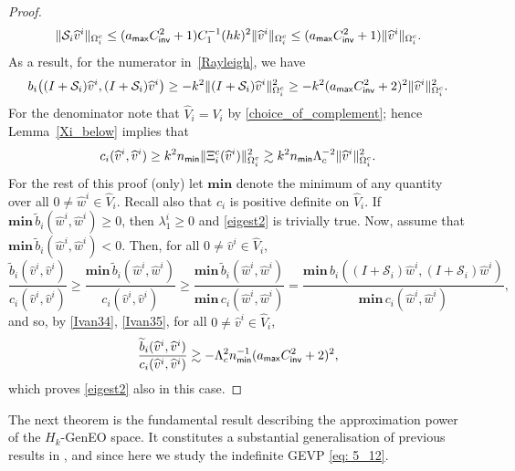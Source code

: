 \documentclass[numbers,webpdf,imaiai]{ima-authoring-template}%
\theoremstyle{thmstyletwo}%
\numberwithin{equation}{section}
\newcommand{\scS}{\mathcal{S}}
\newcommand{\whV}{\widehat{V}}
\newcommand{\whv}{\widehat{v}}
\newcommand{\whw}{\widehat{w}}
\newcommand{\bfmin}{\mathbf{min}\,}
\newcommand{\Cinvt}{C^2_{\textup{\textsf{inv}}}}
\numberwithin{equation}{section}
\newcommand{\amax}{a_{\textup{\textsf{max}}}}
\newcommand{\nmin}{n_{\textup{\textsf{min}}}}
\begin{document}
{\begin{proof}
\begin{equation}
	\|\scS_i\whv^i\|_{\Omega_i^c} \le (\amax\Cinvt + 1) C_1^{-1} (hk)^2 \Vert \whv^i \Vert_{\Omega_i^c} 
	\le (\amax\Cinvt + 1)\Vert \whv^i \Vert_{\Omega_i^c}. 
\end{equation}
As a result, for the numerator in~\eqref{Rayleigh}, we have
\begin{equation} \label{Ivan34}
	b_i\bigl((I+\scS_i)\whv^i , (I+\scS_i)\whv^i\bigr)
	\ge -k^2 \|(I+\scS_i)\whv^i\|_{\Omega_i^c}^2 
	\ge -k^2 (\amax\Cinvt + 2)^2 \|\whv^i\|_{\Omega_i^c}^2.
\end{equation} 
For the denominator note that $\whV_i=V_i$ by \eqref{choice_of_complement}; hence Lemma~\ref{Xi_below} implies that
\begin{equation} 
	c_i(\whv^i, \whv^i) \ge k^2 \nmin\Vert \Xi_i^c( \whv^i )\Vert_{\Omega_i^c}^2  
	\gtrsim  k^2 \nmin\Lambda_c^{-2} \Vert \whv^i \Vert_{\Omega_i^c}^2.
	\label{Ivan35}
\end{equation}
For the rest of this proof (only) let $\mathbf{min}$ denote the  minimum of any quantity over all
$0 \ne {\whw^i} \in \whV_i $.  Recall also that $c_i$ is positive definite on $\whV_i$. 
If $\bfmin\widetilde{b}_i(\whw^i,\whw^i)\ge0$, then $\lambda_1^i\ge0$ and \eqref{eigest2} is trivially true.
Now, assume that $\bfmin \widetilde{b}_i(\whw^i,\whw^i) < 0$.  Then, for all $0 \ne \whv^i \in \whV_i$,   
\[
	\frac{\widetilde{b}_i(\whv^i, \whv^i)}{c_i(\whv^i, \whv^i)} 
	\ge \frac{\bfmin \widetilde{b}_i(\whw^i, \whw^i)}{c_i(\whv^i, \whv^i)} 
	\ge \frac{\bfmin \widetilde{b}_i(\whw^i, \whw^i)}{\bfmin{c_i(\whw^i, \whw^i)}}
	= \frac{\bfmin {b}_i((I + \scS_i)\whw^i, (I + \scS_i)\whw^i)}{\bfmin{c_i(\whw^i, \whw^i)}},
\]
and so, by \eqref{Ivan34}, \eqref{Ivan35}, for all $0 \ne \whv^i \in \whV_i$, 
\[
	\frac{ \widetilde{b}_i( \whv^i, \whv^i )}{c_i(\whv^i, \whv^i)} 
	\gtrsim - \Lambda_c^{2}\nmin^{-1}(\amax\Cinvt+2)^2,
\]
which proves \eqref{eigest2} also in this case.
\end{proof}


The next theorem is the fundamental result describing the approximation power of the $H_k$-GenEO space.  
It constitutes a substantial generalisation of previous results in \cite[Lemma~3.1]{Bootland:2022:OSM}, 
\cite[Lemma~2.11]{Spillane:2014:ARC} and \cite[Lemma~3.14]{Bastian:2021:MSD} since here we study the indefinite 
GEVP \eqref{eq:  5_12}.


}
\end{document}
